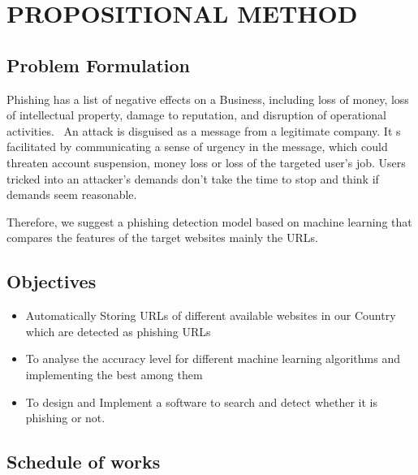 
\normalsize\chapter{PROPOSITIONAL METHOD }
\section{Problem Formulation}
\hspace{.2cm}Phishing has a list of negative effects on a Business, including loss of money, loss of intellectual property, damage to reputation, and disruption of operational activities.  An attack is disguised as a message from a legitimate company. It s facilitated by communicating a sense of urgency in the message, which could threaten account suspension, money loss or loss of the targeted user’s job. Users tricked into an attacker’s demands don’t take the time to stop and think if demands seem reasonable.

Therefore, we suggest a phishing detection model based on machine learning that compares the features of the target websites mainly the URLs.

\section{Objectives}
\begin{itemize}
	\item Automatically Storing URLs of different available websites in our Country which are detected as phishing URLs
	\item To analyse the accuracy level for different machine learning algorithms and implementing the best among them
	\item To design and Implement a software to search and detect whether it is phishing or not.
	
	
\end{itemize}

\section{Schedule of works}

